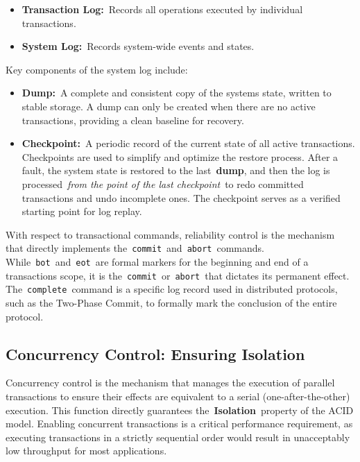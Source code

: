\documentclass{scrbook}
\begin{document}
\begin{itemize}
\item
  \textbf{Transaction Log:}~Records all operations executed by
  individual transactions.
\item
  \textbf{System Log:}~Records system-wide events and states.
\end{itemize}

Key components of the system log include:

\begin{itemize}
\item
  \textbf{Dump:}~A complete and consistent copy of the
  system\textquotesingle s state, written to stable storage. A dump can
  only be created when there are no active transactions, providing a
  clean baseline for recovery.
\item
  \textbf{Checkpoint:}~A periodic record of the current state of all
  active transactions. Checkpoints are used to simplify and optimize the
  restore process. After a fault, the system state is restored to the
  last~\textbf{dump}, and then the log is processed~\emph{from the point
  of the last checkpoint}~to redo committed transactions and undo
  incomplete ones. The checkpoint serves as a verified starting point
  for log replay.
\end{itemize}

With respect to transactional commands, reliability control is the
mechanism that directly implements
the~\texttt{commit}~and~\texttt{abort}~commands.
While~\texttt{bot}~and~\texttt{eot}~are formal markers for the beginning
and end of a transaction\textquotesingle s scope, it is
the~\texttt{commit}~or~\texttt{abort}~that dictates its permanent
effect. The~\texttt{complete}~command is a specific log record used in
distributed protocols, such as the Two-Phase Commit, to formally mark
the conclusion of the entire protocol.

\subsection{Concurrency Control: Ensuring Isolation}

Concurrency control is the mechanism that manages the execution of
parallel transactions to ensure their effects are equivalent to a serial
(one-after-the-other) execution. This function directly guarantees
the~\textbf{Isolation}~property of the ACID model. Enabling concurrent
transactions is a critical performance requirement, as executing
transactions in a strictly sequential order would result in unacceptably
low throughput for most applications.
\end{document}

